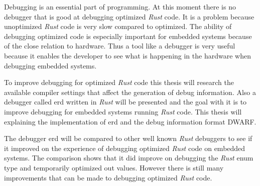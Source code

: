 Debugging is an essential part of programming.
At this moment there is no debugger that is good at debugging optimized \emph{Rust} code.
It is a problem because unoptimized \emph{Rust} code is very slow compared to optimized.
The ability of debugging optimized code is especially important for embedded systems because of the close relation to hardware.
Thus a tool like a debugger is very useful because it enables the developer to see what is happening in the hardware when debugging embedded systems.


To improve debugging for optimized \emph{Rust} code this thesis will research the available compiler settings that affect the generation of debug information.
Also a debugger called \acrshort{erd} written in \emph{Rust} will be presented and the goal with it is to improve debugging for embedded systems running \emph{Rust} code.
This thesis will explaining the implementation of \acrshort{erd} and the debug information format \acrshort{DWARF}.


The debugger \acrshort{erd} will be compared to other well known \emph{Rust} debuggers to see if it improved on the experience of debugging optimized \emph{Rust} code on embedded systems.
The comparison shows that it did improve on debugging the \emph{Rust} enum type and temporarily optimized out values.
However there is still many improvements that can be made to debugging optimized \emph{Rust} code.


